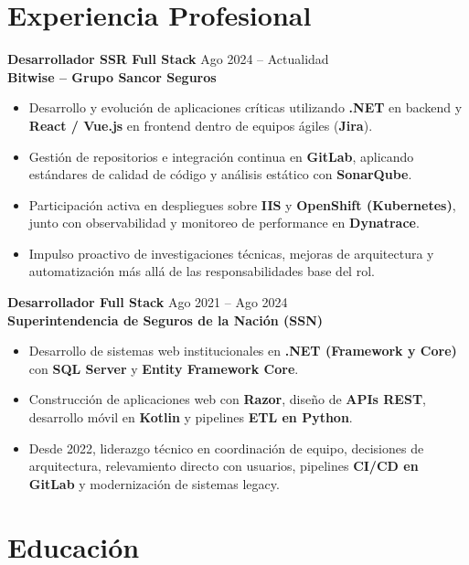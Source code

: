 \documentclass[10pt,a4paper]{article}
\newcommand{\cvjob}[4]{
  {\normalsize\bfseries\color{darktext}#1} \hfill {\footnotesize\color{mutedtext}#3}\\[1pt]
  {\small\bfseries\color{primary}#2}\\[2pt]
  {\footnotesize\color{darktext}#4}\vspace{5pt}
}
\begin{document}
\noindent\hspace*{0.9cm}%
\begin{minipage}[t]{11.9cm}

\section{Experiencia Profesional}

\cvjob{Desarrollador SSR Full Stack}{Bitwise -- Grupo Sancor Seguros}{Ago 2024 -- Actualidad}{
  \begin{itemize}[leftmargin=1.2em, itemsep=1.5pt, topsep=1pt, parsep=0pt]
    \item Desarrollo y evolución de aplicaciones críticas utilizando \textbf{.NET} en backend y \textbf{React / Vue.js} en frontend dentro de equipos ágiles (\textbf{Jira}).
    \item Gestión de repositorios e integración continua en \textbf{GitLab}, aplicando estándares de calidad de código y análisis estático con \textbf{SonarQube}.
    \item Participación activa en despliegues sobre \textbf{IIS} y \textbf{OpenShift (Kubernetes)}, junto con observabilidad y monitoreo de performance en \textbf{Dynatrace}.
    \item Impulso proactivo de investigaciones técnicas, mejoras de arquitectura y automatización más allá de las responsabilidades base del rol.
  \end{itemize}
}

\cvjob{Desarrollador Full Stack}{Superintendencia de Seguros de la Nación (SSN)}{Ago 2021 -- Ago 2024}{
  \begin{itemize}[leftmargin=1.2em, itemsep=1.5pt, topsep=1pt, parsep=0pt]
    \item Desarrollo de sistemas web institucionales en \textbf{.NET (Framework y Core)} con \textbf{SQL Server} y \textbf{Entity Framework Core}.
    \item Construcción de aplicaciones web con \textbf{Razor}, diseño de \textbf{APIs REST}, desarrollo móvil en \textbf{Kotlin} y pipelines \textbf{ETL en Python}.
    \item Desde 2022, liderazgo técnico en coordinación de equipo, decisiones de arquitectura, relevamiento directo con usuarios, pipelines \textbf{CI/CD en GitLab} y modernización de sistemas legacy.
  \end{itemize}
}

\section{Educación}


\end{minipage}
\end{document}
